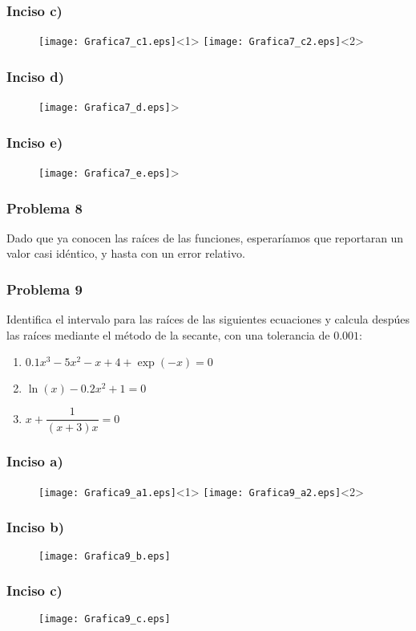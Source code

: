 \begin{frame}
\frametitle{Inciso c)}
\begin{figure}
	\centering
	\texttt{[image: Grafica7\_c1.eps]}<1>
	\texttt{[image: Grafica7\_c2.eps]}<2>
\end{figure}
\end{frame}
\begin{frame}
\frametitle{Inciso d)}
\begin{figure}
	\centering
	\texttt{[image: Grafica7\_d.eps]}>
\end{figure}
\end{frame}
\begin{frame}
\frametitle{Inciso e)}
\begin{figure}
	\centering
	\texttt{[image: Grafica7\_e.eps]}>
\end{figure}
\end{frame}
\begin{frame}
\frametitle{Problema 8}
Dado que ya conocen las ra\'{i}ces de las funciones, esperar\'{i}amos que reportaran un valor casi id\'{e}ntico, y hasta con un error relativo.
\end{frame}
\begin{frame}
\frametitle{Problema 9}
Identifica el intervalo para las ra\'{i}ces de las siguientes ecuaciones y calcula desp\'{u}es las ra\'{i}ces mediante el m\'{e}todo de la secante, con una tolerancia de $0.001$:
	\begin{enumerate}
		\item $0.1 x^{3} - 5 x^{2} - x + 4 + \exp(-x) = 0 $
		\item $\ln(x) -0.2 x^{2} + 1 = 0$
		\item $x + \dfrac{1}{(x+3)x}= 0$
	\end{enumerate}
\end{frame}
\begin{frame}
\frametitle{Inciso a)}
\begin{figure}
	\centering
	\texttt{[image: Grafica9\_a1.eps]}<1> 
	\texttt{[image: Grafica9\_a2.eps]}<2>
\end{figure}
\end{frame}
\begin{frame}
\frametitle{Inciso b)}
\begin{figure}
	\centering
	\texttt{[image: Grafica9\_b.eps]} 
\end{figure}
\end{frame}
\begin{frame}
\frametitle{Inciso c)}
\begin{figure}
	\centering
	\texttt{[image: Grafica9\_c.eps]} 
\end{figure}
\end{frame}
